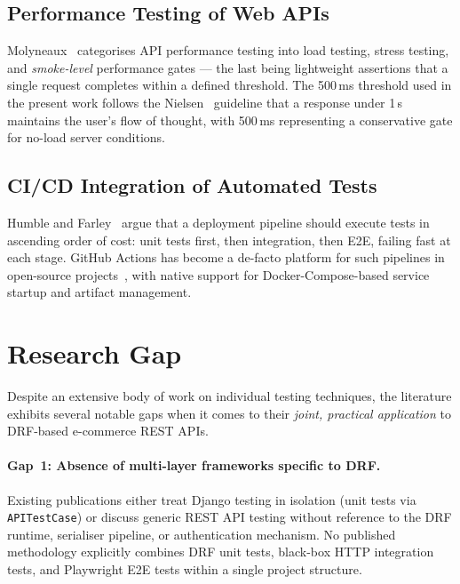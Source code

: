\documentclass[12pt, a4paper]{article}
\begin{document}
\subsection{Performance Testing of Web APIs}

Molyneaux~\cite{molyneaux2014} categorises API performance testing into load
testing, stress testing, and \textit{smoke-level} performance gates — the last
being lightweight assertions that a single request completes within a defined
threshold.  The 500\,ms threshold used in the present work follows the
Nielsen~\cite{nielsen1993} guideline that a response under 1\,s maintains the
user's flow of thought, with 500\,ms representing a conservative gate for
no-load server conditions.

\subsection{CI/CD Integration of Automated Tests}

Humble and Farley~\cite{humble2010} argue that a deployment pipeline should
execute tests in ascending order of cost: unit tests first, then integration,
then E2E, failing fast at each stage.  GitHub Actions has become a de-facto
platform for such pipelines in open-source projects~\cite{github_actions}, with
native support for Docker-Compose-based service startup and artifact
management.

\section{Research Gap}
\label{sec:gap}

Despite an extensive body of work on individual testing techniques, the
literature exhibits several notable gaps when it comes to their \textit{joint,
practical application} to DRF-based e-commerce REST APIs.

\paragraph{Gap~1: Absence of multi-layer frameworks specific to DRF.}
Existing publications either treat Django testing in isolation (unit tests via
\texttt{APITestCase}) or discuss generic REST API testing without reference to
the DRF runtime, serialiser pipeline, or authentication mechanism.  No published
methodology explicitly combines DRF unit tests, black-box HTTP integration tests,
and Playwright E2E tests within a single project structure.
\end{document}
